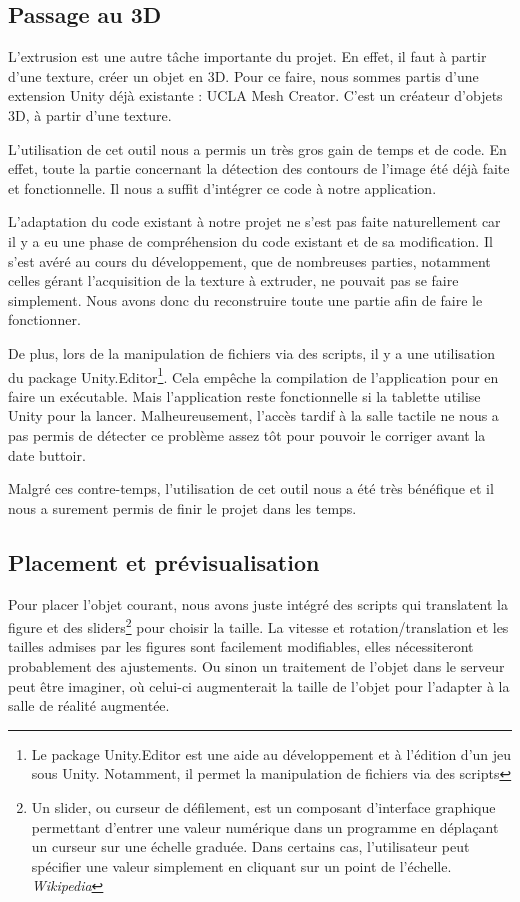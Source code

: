 \documentclass[a4paper,11pt]{article}
\begin{document}
		\hypertarget{ancre}{
		\subsection{Passage au 3D}} %
		\label{extrusion}
			L'extrusion est une autre tâche importante du projet. En effet, il faut à partir d'une texture, créer un objet en 3D. Pour ce faire, nous sommes partis d'une extension Unity déjà existante : UCLA Mesh Creator. C'est un créateur d'objets 3D, à partir d'une texture.
			
			L'utilisation de cet outil nous a permis un très gros gain de temps et de code. En effet, toute la partie concernant la détection des contours de l'image été déjà faite et fonctionnelle. Il nous a suffit d'intégrer ce code à notre application.
			
			L'adaptation du code existant à notre projet ne s'est pas faite naturellement car il y a eu une phase de compréhension du code existant et de sa modification. Il s'est avéré au cours du développement, que de nombreuses parties, notamment celles gérant l'acquisition de la texture à extruder, ne pouvait pas se faire simplement. Nous avons donc du reconstruire toute une partie afin de faire le fonctionner.
			
			De plus, lors de la manipulation de fichiers via des scripts, il y a une utilisation du package Unity.Editor\footnote{Le package Unity.Editor est une aide au développement et à l'édition d'un jeu sous Unity. Notamment, il permet la manipulation de fichiers via des scripts}. Cela empêche la compilation de l'application pour en faire un exécutable. Mais l'application reste fonctionnelle si la tablette utilise Unity pour la lancer. Malheureusement, l'accès tardif à la salle tactile ne nous a pas permis de détecter ce problème assez tôt pour pouvoir le corriger avant la date buttoir.
			
			Malgré ces contre-temps, l'utilisation de cet outil nous a été très bénéfique et il nous a surement permis de finir le projet dans les temps.
		\subsection{Placement et prévisualisation} %
		
			Pour placer l'objet courant, nous avons juste intégré des scripts qui translatent la figure et des sliders\footnote{Un slider, ou curseur de défilement, est un composant d'interface graphique permettant d'entrer une valeur numérique dans un programme en déplaçant un curseur sur une échelle graduée. Dans certains cas, l'utilisateur peut spécifier une valeur simplement en cliquant sur un point de l’échelle. \emph{Wikipedia}} pour choisir la taille. La vitesse et rotation/translation et les tailles admises par les figures sont facilement modifiables, elles nécessiteront probablement des ajustements. Ou sinon un traitement de l'objet dans le serveur peut être imaginer, où celui-ci augmenterait la taille de l'objet pour l'adapter à la salle de réalité augmentée.
			
\end{document}
